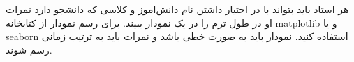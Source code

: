 هر استاد باید بتواند با در اختیار داشتن نام دانش‌اموز و کلاسی که دانشجو دارد نمرات او در طول ترم را  در یک نمودار ببیند. برای رسم 
نمودار از کتابخانه matplotlib و یا seaborn استفاده کنید. نمودار باید به صورت خطی باشد و نمرات باید به ترتیب زمانی رسم شوند.     